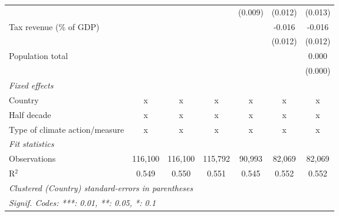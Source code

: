 \begin{tabular}{lcccccc}
                                         &              &                &                & (0.009)        & (0.012)        & (0.013)\\   
   Tax revenue (\% of GDP)               &              &                &                &                & -0.016         & -0.016\\   
                                         &              &                &                &                & (0.012)        & (0.012)\\   
   Population total                      &              &                &                &                &                & 0.000\\   
                                         &              &                &                &                &                & (0.000)\\   
   \emph{Fixed effects}\\
   Country                               & x            & x              & x              & x              & x              & x\\  
   Half decade                           & x            & x              & x              & x              & x              & x\\  
   Type of climate action/measure        & x            & x              & x              & x              & x              & x\\  
   \midrule \emph{Fit statistics}\\
   Observations                          & 116,100      & 116,100        & 115,792        & 90,993         & 82,069         & 82,069\\  
   R$^2$                                 & 0.549        & 0.550          & 0.551          & 0.545          & 0.552          & 0.552\\  
   \midrule
   \multicolumn{7}{l}{\emph{Clustered (Country) standard-errors in parentheses}}\\
   \multicolumn{7}{l}{\emph{Signif. Codes: ***: 0.01, **: 0.05, *: 0.1}}\\
\end{tabular}
\par\endgroup


